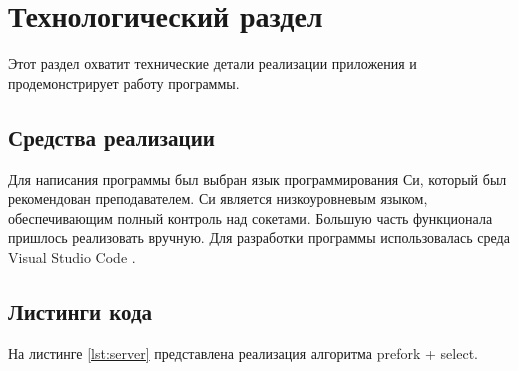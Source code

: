 \documentclass{bmstu}
\begin{document}
\chapter{Технологический раздел}

Этот раздел охватит технические детали реализации приложения и продемонстрирует работу программы.

\section{Средства реализации}

Для написания программы был выбран язык программирования Си, который был рекомендован преподавателем. Си 
является низкоуровневым языком, обеспечивающим полный контроль над сокетами. Большую часть функционала 
пришлось реализовать вручную.
Для разработки программы использовалась среда Visual Studio Code \cite{vscode}.

\section{Листинги кода}

На листинге \ref{lst:server} представлена реализация алгоритма prefork + select.
\end{document}
